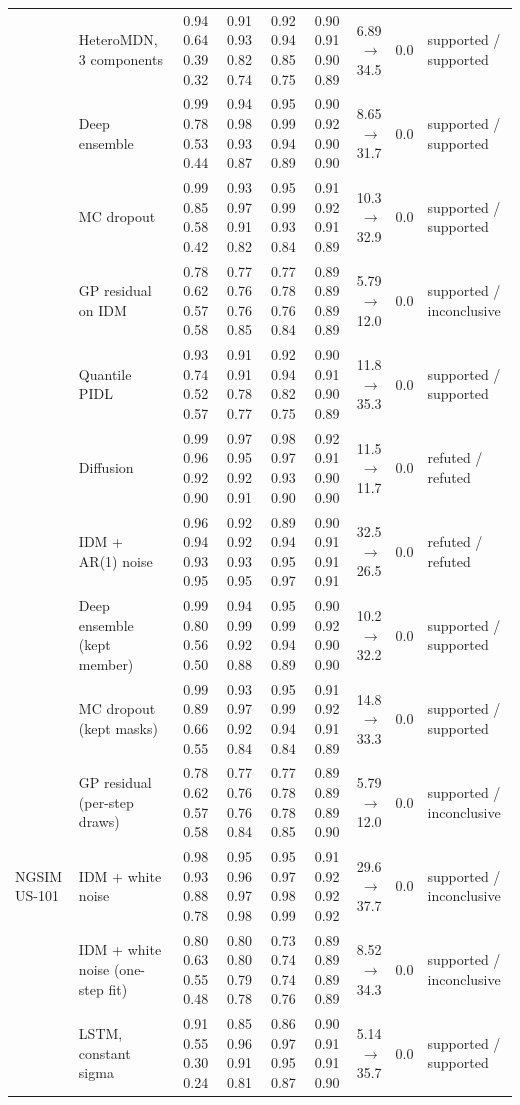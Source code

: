 \begin{longtable}{llrrrrrrl}
 & HeteroMDN, 3 components & 0.94 0.64 0.39 0.32 & 0.91 0.93 0.82 0.74 & 0.92 0.94 0.85 0.75 & 0.90 0.91 0.90 0.89 & 6.89 $\rightarrow$ 34.5 & 0.0 & supported / supported \\
 & Deep ensemble & 0.99 0.78 0.53 0.44 & 0.94 0.98 0.93 0.87 & 0.95 0.99 0.94 0.89 & 0.90 0.92 0.90 0.90 & 8.65 $\rightarrow$ 31.7 & 0.0 & supported / supported \\
 & MC dropout & 0.99 0.85 0.58 0.42 & 0.93 0.97 0.91 0.82 & 0.95 0.99 0.93 0.84 & 0.91 0.92 0.91 0.89 & 10.3 $\rightarrow$ 32.9 & 0.0 & supported / supported \\
 & GP residual on IDM & 0.78 0.62 0.57 0.58 & 0.77 0.76 0.76 0.85 & 0.77 0.78 0.76 0.84 & 0.89 0.89 0.89 0.89 & 5.79 $\rightarrow$ 12.0 & 0.0 & supported / inconclusive \\
 & Quantile PIDL & 0.93 0.74 0.52 0.57 & 0.91 0.91 0.78 0.77 & 0.92 0.94 0.82 0.75 & 0.90 0.91 0.90 0.89 & 11.8 $\rightarrow$ 35.3 & 0.0 & supported / supported \\
 & Diffusion & 0.99 0.96 0.92 0.90 & 0.97 0.95 0.92 0.91 & 0.98 0.97 0.93 0.90 & 0.92 0.91 0.90 0.90 & 11.5 $\rightarrow$ 11.7 & 0.0 & refuted / refuted \\
 & IDM + AR(1) noise & 0.96 0.94 0.93 0.95 & 0.92 0.92 0.93 0.95 & 0.89 0.94 0.95 0.97 & 0.90 0.91 0.91 0.91 & 32.5 $\rightarrow$ 26.5 & 0.0 & refuted / refuted \\
 & Deep ensemble (kept member) & 0.99 0.80 0.56 0.50 & 0.94 0.99 0.92 0.88 & 0.95 0.99 0.94 0.89 & 0.90 0.92 0.90 0.90 & 10.2 $\rightarrow$ 32.2 & 0.0 & supported / supported \\
 & MC dropout (kept masks) & 0.99 0.89 0.66 0.55 & 0.93 0.97 0.92 0.84 & 0.95 0.99 0.94 0.84 & 0.91 0.92 0.91 0.89 & 14.8 $\rightarrow$ 33.3 & 0.0 & supported / supported \\
 & GP residual (per-step draws) & 0.78 0.62 0.57 0.58 & 0.77 0.76 0.76 0.84 & 0.77 0.78 0.78 0.85 & 0.89 0.89 0.89 0.90 & 5.79 $\rightarrow$ 12.0 & 0.0 & supported / inconclusive \\
\midrule
NGSIM US-101 & IDM + white noise & 0.98 0.93 0.88 0.78 & 0.95 0.96 0.97 0.98 & 0.95 0.97 0.98 0.99 & 0.91 0.92 0.92 0.92 & 29.6 $\rightarrow$ 37.7 & 0.0 & supported / inconclusive \\
 & IDM + white noise (one-step fit) & 0.80 0.63 0.55 0.48 & 0.80 0.80 0.79 0.78 & 0.73 0.74 0.74 0.76 & 0.89 0.89 0.89 0.89 & 8.52 $\rightarrow$ 34.3 & 0.0 & supported / inconclusive \\
 & LSTM, constant sigma & 0.91 0.55 0.30 0.24 & 0.85 0.96 0.91 0.81 & 0.86 0.97 0.95 0.87 & 0.90 0.91 0.91 0.90 & 5.14 $\rightarrow$ 35.7 & 0.0 & supported / supported \\

\end{longtable}
